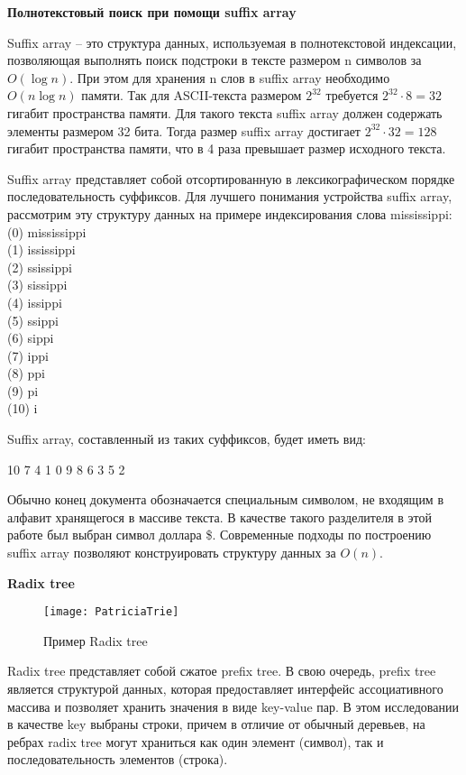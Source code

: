 \textbf{Полнотекстовый поиск при помощи suffix array}

Suffix array -- это структура данных, используемая в полнотекстовой индексации, позволяющая выполнять
поиск подстроки в тексте размером n символов за $O(\log{}n)$.
При этом для хранения n слов в suffix array необходимо $O(n \log{}n)$ памяти.
Так для ASCII-текста размером $2^{32}$ требуется $2^{32} \cdot 8 = 32$ гигабит пространства памяти.
Для такого текста suffix array должен содержать элементы размером 32 бита.
Тогда размер suffix array достигает $2^{32} \cdot 32 = 128$ гигабит пространства памяти,
что в 4 раза превышает размер исходного текста.

Suffix array представляет собой отсортированную в лексикографическом порядке
последовательность суффиксов. Для лучшего понимания устройства suffix array, рассмотрим эту структуру данных на примере индексирования
слова mississippi:
\\(0) mississippi
\\(1) ississippi
\\(2) ssissippi
\\(3) sissippi
\\(4) issippi
\\(5) ssippi
\\(6) sippi
\\(7) ippi
\\(8) ppi
\\(9) pi
\\(10) i

Suffix array, составленный из таких суффиксов, будет иметь вид:

10 7 4 1 0 9 8 6 3 5 2

Обычно конец документа обозначается специальным символом, не входящим в алфавит хранящегося в массиве текста.
В качестве такого разделителя в этой работе был выбран символ доллара \$.
Современные подходы по построению suffix array позволяют конструировать структуру данных за $O(n)$.

\textbf{Radix tree}


\begin{wrapfigure}{r}{0.25\textwidth} %
 \centering
 \texttt{[image: PatriciaTrie]}
 \caption{Пример Radix tree}
\end{wrapfigure}

Radix tree представляет собой сжатое prefix tree. В свою очередь, prefix tree является
структурой данных, которая предоставляет интерфейс ассоциативного массива и позволяет
хранить значения в виде key-value пар.
В этом исследовании в качестве key выбраны строки, причем в отличие от обычный деревьев,
на ребрах radix tree могут храниться как один элемент (символ),
так и последовательность элементов (строка).

